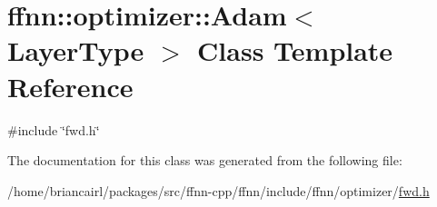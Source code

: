 \hypertarget{classffnn_1_1optimizer_1_1_adam}{\section{ffnn\-:\-:optimizer\-:\-:Adam$<$ Layer\-Type $>$ Class Template Reference}
\label{classffnn_1_1optimizer_1_1_adam}
}


{\ttfamily \#include \char`\"{}fwd.\-h\char`\"{}}



The documentation for this class was generated from the following file\-:\begin{DoxyCompactItemize}
\item 
/home/briancairl/packages/src/ffnn-\/cpp/ffnn/include/ffnn/optimizer/\hyperlink{fwd_8h}{fwd.\-h}\end{DoxyCompactItemize}
